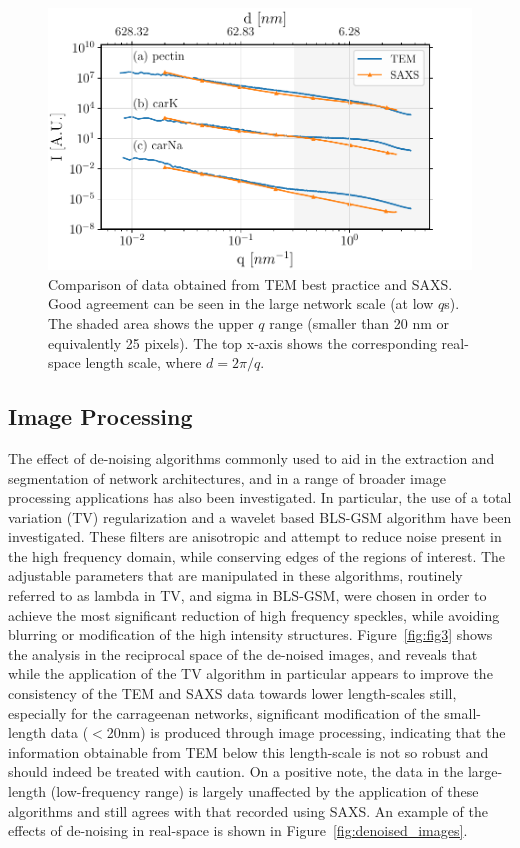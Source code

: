 \begin{figure}[!ht]
    \centering
    \noindent\includegraphics[width=0.95\linewidth]{Figures/chapter-temsaxs/saxs-tem-merged.pdf}
    \caption{Comparison of data obtained from TEM best practice and SAXS. Good agreement can be seen in the large network scale (at low $q$s). The shaded area shows the upper $q$ range (smaller than 20 \si{\nm} or equivalently 25 pixels). The top x-axis shows the corresponding real-space length scale, where $d = 2\pi/q$.} \label{fig:TEM_vs_SAXS}
\end{figure}

\subsection{Image Processing}
The effect of de-noising algorithms commonly used to aid in the extraction and segmentation of network architectures, and in a range of broader image processing applications has also been investigated. In particular, the use of a total variation (TV) regularization \cite{barbero_fast_2011, barbero_modular_2014} and a wavelet based BLS-GSM algorithm \cite{portilla_image_2003, rajaei_analysis_2014, hernandez-cerdan_isotropic_2017} have been investigated. These filters are anisotropic and attempt to reduce noise present in the high frequency domain, while conserving edges of the regions of interest. The adjustable parameters that are manipulated in these algorithms, routinely referred to as lambda in TV, and sigma in BLS-GSM, were chosen in order to achieve the most significant reduction of high frequency speckles, while avoiding blurring or modification of the high intensity structures.
Figure~\ref{fig:fig3} shows the analysis in the reciprocal space of the de-noised images, and reveals that while the application of the TV algorithm in particular appears to improve the consistency of the TEM and SAXS data towards lower length-scales still, especially for the carrageenan networks, significant modification of the small-length data ($<$20\si{\nm}) is produced through image processing, indicating that the information obtainable from TEM below this length-scale is not so robust and should indeed be treated with caution. On a positive note, the data in the large-length (low-frequency range) is largely unaffected by the application of these algorithms and still agrees with that recorded using SAXS. An example of the effects of de-noising in real-space is shown in Figure~\ref{fig:denoised_images}.

